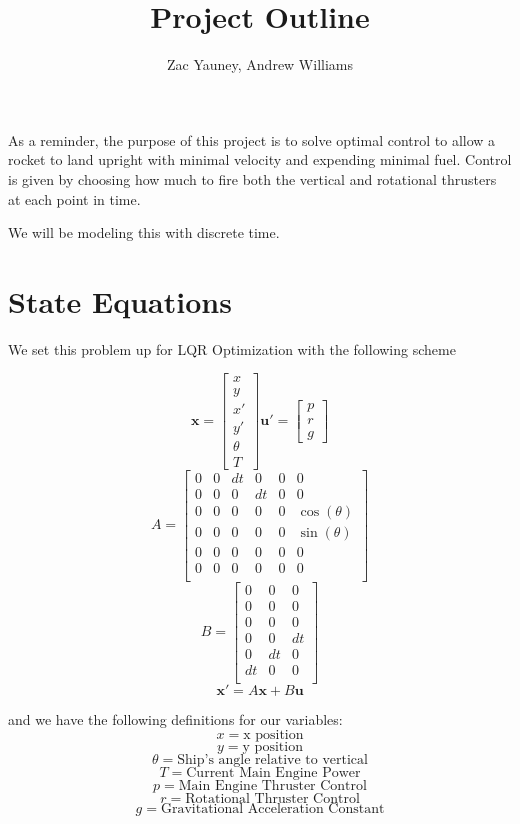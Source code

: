 \documentclass{article}
\title{Project Outline}
\author{Zac Yauney, Andrew Williams}
\begin{document}
\maketitle

As a reminder, the purpose of this project is to solve optimal control to allow a rocket to land upright with minimal velocity and expending minimal fuel. Control is given by choosing how much to fire both the vertical and rotational thrusters at each point in time.

We will be modeling this with discrete time.

\section{State Equations}

We set this problem up for LQR Optimization with the following scheme

\[
	\mathbf{x} =
	\begin{bmatrix}
		x\\
		y\\
		x'\\
		y'\\
		\theta\\
		T
\end{bmatrix}
\mathbf{u}' =
	\begin{bmatrix}
		p\\
		r\\
		g
\end{bmatrix}
\]
\[
	A=\begin{bmatrix}
		0 &0 &dt &0 &0 &0\\
		0 &0 &0 &dt &0 &0\\
		0 &0 &0 &0 &0 &\cos(\theta)\\
		0 &0 &0 &0 &0 &\sin(\theta)\\
		0 &0 &0 &0 &0 &0\\
		0 &0 &0 &0 &0 &0\\
\end{bmatrix}
\]
\[
	B=\begin{bmatrix}
		0 &0 &0 \\
		0 &0 &0 \\
		0 &0 &0 \\
		0 &0 &dt \\
		0 &dt &0 \\
		dt &0 &0 \\
\end{bmatrix}
\]
\[
	\mathbf{x}' = A\mathbf{x} + B\mathbf{u}
\]


and we have the following definitions for our variables:
\[
 x = \text{x position}
\]
\[
 y = \text{y position}
\]
\[
 \theta = \text{Ship's angle relative to vertical}
\]
\[
 T = \text{Current Main Engine Power}
\]
\[
	p = \text{Main Engine Thruster Control}
\]
\[
	r = \text{Rotational Thruster Control}
\]
\[
	g = \text{Gravitational Acceleration Constant}
\]
\end{document}
